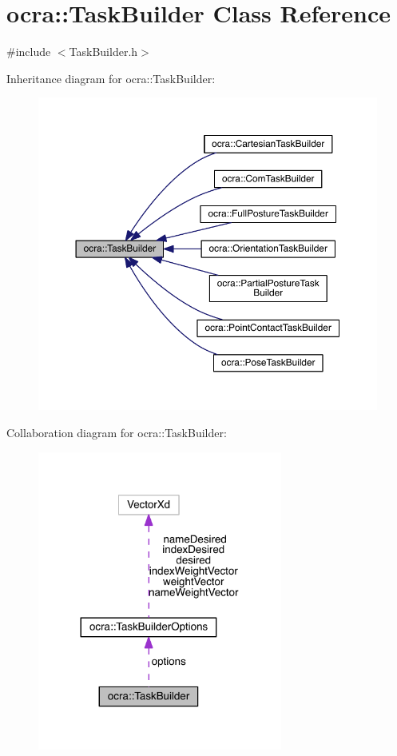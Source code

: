 \hypertarget{classocra_1_1TaskBuilder}{}\section{ocra\+:\+:Task\+Builder Class Reference}
\label{classocra_1_1TaskBuilder}


{\ttfamily \#include $<$Task\+Builder.\+h$>$}



Inheritance diagram for ocra\+:\+:Task\+Builder\+:\nopagebreak
\begin{figure}[H]
\begin{center}
\leavevmode
\includegraphics[width=350pt]{df/dc8/classocra_1_1TaskBuilder__inherit__graph}
\end{center}
\end{figure}


Collaboration diagram for ocra\+:\+:Task\+Builder\+:\nopagebreak
\begin{figure}[H]
\begin{center}
\leavevmode
\includegraphics[width=228pt]{df/d45/classocra_1_1TaskBuilder__coll__graph}
\end{center}
\end{figure}
